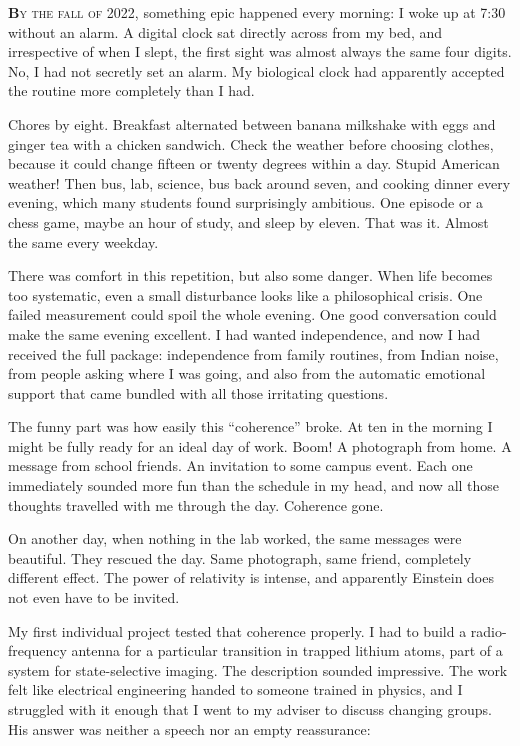 \documentclass[11pt,twoside,openany]{book}
\newcommand{\dropcap}[2]{\lettrine[lines=3,findent=2pt,nindent=4pt]{\color{accent}\textsf{\textbf{#1}}}{#2}}
\newcommand{\scene}{\par\vspace{0.7em}{\centering\color{accent}\rule{0.85cm}{0.6pt}\par}\vspace{0.5em}\noindent\ignorespaces}
\begin{document}
\dropcap{B}{y the fall of 2022,} something epic happened every morning: I
woke up at 7:30 without an alarm. A digital clock sat directly across from my
bed, and irrespective of when I slept, the first sight was almost always the
same four digits. No, I had not secretly set an alarm. My biological clock had
apparently accepted the routine more completely than I had.

Chores by eight. Breakfast alternated between banana milkshake with eggs and
ginger tea with a chicken sandwich. Check the weather before choosing clothes,
because it could change fifteen or twenty degrees within a day. Stupid
American weather! Then bus, lab, science, bus back around seven, and cooking
dinner every evening, which many students found surprisingly ambitious. One
episode or a chess game, maybe an hour of study, and sleep by eleven. That was
it. Almost the same every weekday.

There was comfort in this repetition, but also some danger. When life becomes
too systematic, even a small disturbance looks like a philosophical crisis.
One failed measurement could spoil the whole evening. One good conversation
could make the same evening excellent. I had wanted independence, and now I
had received the full package: independence from family routines, from Indian
noise, from people asking where I was going, and also from the automatic
emotional support that came bundled with all those irritating questions.

The funny part was how easily this ``coherence'' broke. At ten in the morning
I might be fully ready for an ideal day of work. Boom! A photograph from home.
A message from school friends. An invitation to some campus event. Each one
immediately sounded more fun than the schedule in my head, and now all those
thoughts travelled with me through the day. Coherence gone.

On another day, when nothing in the lab worked, the same messages were
beautiful. They rescued the day. Same photograph, same friend, completely
different effect. The power of relativity is intense, and apparently Einstein
does not even have to be invited.

\scene

My first individual project tested that coherence properly. I had to build a
radio-frequency antenna for a particular transition in trapped lithium atoms,
part of a system for state-selective imaging. The description sounded
impressive. The work felt like electrical engineering handed to someone
trained in physics, and I struggled with it enough that I went to my adviser
to discuss changing groups. His answer was neither a speech nor an empty
reassurance:
\end{document}

